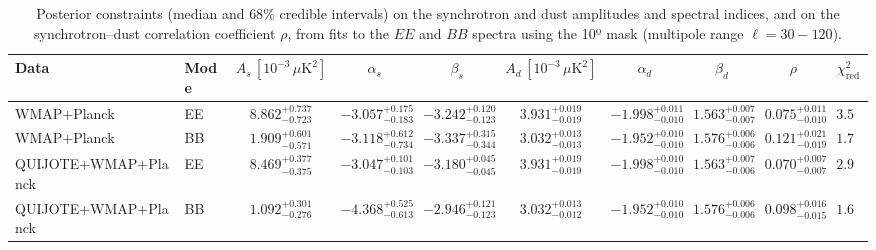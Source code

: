 \begin{table}[h]
\centering
\scriptsize
\setlength{\tabcolsep}{4pt}
\caption{Posterior constraints (median and $68\%$ credible intervals) on the synchrotron and dust amplitudes and spectral indices, and on the synchrotron--dust correlation coefficient $\rho$, from fits to the $EE$ and $BB$ spectra using the 10º mask (multipole range $\ell=30-120$).}
\label{tab:fit_no_QQ_autos_ell30-120}
\begin{tabular}{llcccccccc}
\toprule
Data & Mode & $A_s\,[10^{-3}\,\mu\mathrm{K}^2]$ & $\alpha_s$ & $\beta_s$ & $A_d\,[10^{-3}\,\mu\mathrm{K}^2]$ & $\alpha_d$ & $\beta_d$ & $\rho$ & $\chi^2_\mathrm{red}$ \\
\midrule
WMAP+Planck & EE & $8.862^{+0.737}_{-0.723}$ & $-3.057^{+0.175}_{-0.183}$ & $-3.242^{+0.120}_{-0.123}$ & $3.931^{+0.019}_{-0.019}$ & $-1.998^{+0.011}_{-0.010}$ & $1.563^{+0.007}_{-0.007}$ & $0.075^{+0.011}_{-0.010}$ & $3.55$ \\
WMAP+Planck & BB & $1.909^{+0.601}_{-0.571}$ & $-3.118^{+0.612}_{-0.734}$ & $-3.337^{+0.315}_{-0.344}$ & $3.032^{+0.013}_{-0.013}$ & $-1.952^{+0.010}_{-0.010}$ & $1.576^{+0.006}_{-0.006}$ & $0.121^{+0.021}_{-0.019}$ & $1.79$ \\
QUIJOTE+WMAP+Planck & EE & $8.469^{+0.377}_{-0.375}$ & $-3.047^{+0.101}_{-0.103}$ & $-3.180^{+0.045}_{-0.045}$ & $3.931^{+0.019}_{-0.019}$ & $-1.998^{+0.010}_{-0.010}$ & $1.563^{+0.007}_{-0.006}$ & $0.070^{+0.007}_{-0.007}$ & $2.99$ \\
QUIJOTE+WMAP+Planck & BB & $1.092^{+0.301}_{-0.276}$ & $-4.368^{+0.525}_{-0.613}$ & $-2.946^{+0.121}_{-0.123}$ & $3.032^{+0.013}_{-0.012}$ & $-1.952^{+0.010}_{-0.010}$ & $1.576^{+0.006}_{-0.006}$ & $0.098^{+0.016}_{-0.015}$ & $1.64$ \\
\bottomrule
\end{tabular}
\end{table}